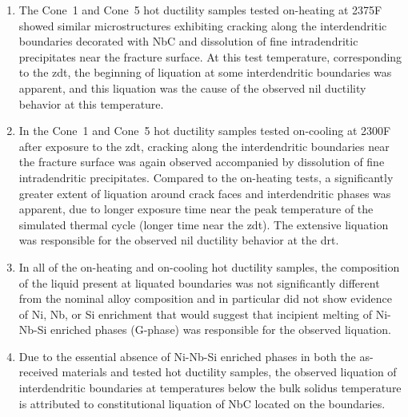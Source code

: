 \begin{enumerate}
\item The Cone~1 and Cone~5 hot ductility samples tested on-heating at 2375\textdegree{}F showed similar microstructures exhibiting cracking along the interdendritic boundaries decorated with NbC and dissolution of fine intradendritic precipitates near the fracture surface. At this test temperature, corresponding to the \gls{zdt}, the beginning of liquation at some interdendritic boundaries was apparent, and this liquation was the cause of the observed nil ductility behavior at this temperature.
\item In the Cone~1 and Cone~5 hot ductility samples tested on-cooling at 2300\textdegree{}F after exposure to the \gls{zdt}, cracking along the interdendritic boundaries near the fracture surface was again observed accompanied by dissolution of fine intradendritic precipitates. Compared to the on-heating tests, a significantly greater extent of liquation around crack faces and interdendritic phases was apparent, due to longer exposure time near the peak temperature of the simulated thermal cycle (longer time near the \gls{zdt}). The extensive liquation was responsible for the observed nil ductility behavior at the \gls{drt}.
\item In all of the on-heating and on-cooling hot ductility samples, the composition of the liquid present at liquated boundaries was not significantly different from the nominal alloy composition and in particular did not show evidence of Ni, Nb, or Si enrichment that would suggest that incipient melting of Ni-Nb-Si enriched phases (G-phase) was responsible for the observed liquation.
\item Due to the essential absence of Ni-Nb-Si enriched phases in both the as-received materials and tested hot ductility samples, the observed liquation of interdendritic boundaries at temperatures below the bulk solidus temperature is attributed to constitutional liquation of NbC located on the boundaries.

\end{enumerate}


